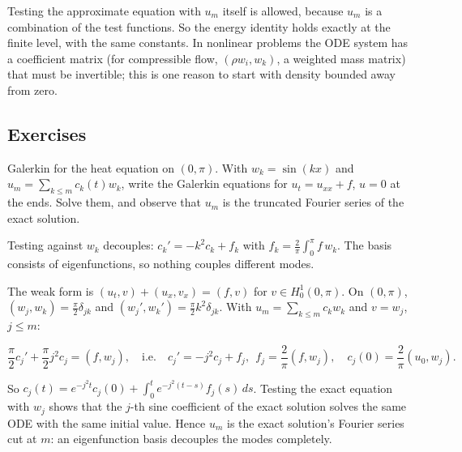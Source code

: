 Testing the approximate equation with $u_m$ itself is allowed, because $u_m$ is a combination of the test functions. So the energy identity holds exactly at the finite level, with the same constants. In nonlinear problems the ODE system has a coefficient matrix (for compressible flow, $(\rho w_i,w_k)$, a weighted mass matrix) that must be invertible; this is one reason to start with density bounded away from zero.

\subsection*{Exercises}

\begin{exercise}
  Galerkin for the heat equation on $(0,\pi)$. With $w_k = \sin(kx)$ and $u_m = \sum_{k\le m}c_k(t)w_k$, write the Galerkin equations for $u_t = u_{xx} + f$, $u = 0$ at the ends. Solve them, and observe that $u_m$ is the truncated Fourier series of the exact solution.
  \begin{hint}
    Testing against $w_k$ decouples: $c_k' = -k^2c_k + f_k$ with $f_k = \frac2\pi\int_0^\pi f\,w_k$. The basis consists of eigenfunctions, so nothing couples different modes.
  \end{hint}
  \begin{solution}
    The weak form is $(u_t, v) + (u_x, v_x) = (f, v)$ for $v \in H^1_0(0,\pi)$. On $(0,\pi)$, $(w_j, w_k) = \frac\pi2\delta_{jk}$ and $(w_j', w_k') = \frac\pi2k^2\delta_{jk}$. With $u_m = \sum_{k\le m}c_kw_k$ and $v = w_j$, $j \le m$:

    \[ \frac\pi2c_j' + \frac\pi2j^2c_j = (f, w_j), \quad\text{i.e.}\quad c_j' = -j^2c_j + f_j,\ \ f_j = \frac2\pi(f,w_j), \quad c_j(0) = \frac2\pi(u_0,w_j). \]

    So $c_j(t) = e^{-j^2t}c_j(0) + \int_0^te^{-j^2(t-s)}f_j(s)\,ds$. Testing the exact equation with $w_j$ shows that the $j$-th sine coefficient of the exact solution solves the same ODE with the same initial value. Hence $u_m$ is the exact solution's Fourier series cut at $m$: an eigenfunction basis decouples the modes completely.
  \end{solution}
\end{exercise}

